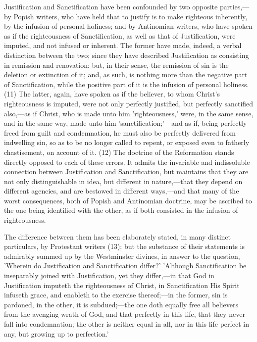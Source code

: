\documentclass[
]{book}
\begin{document}
Justification and Sanctification have been confounded by two opposite parties,---by Popish writers, who have held that to justify is to make righteous inherently, by the infusion of personal holiness; and by Antinomian writers, who have spoken as if the righteousness of Sanctification, as well as that of Justification, were imputed, and not infused or inherent. The former have made, indeed, a verbal distinction between the two; since they have described Justification as consisting in remission and renovation: but, in their sense, the remission of sin is the deletion or extinction of it; and, as such, is nothing more than the negative part of Sanctification, while the positive part of it is the infusion of personal holiness. (11) The latter, again, have spoken as if the believer, to whom Christ's righteousness is imputed, were not only perfectly justified, but perfectly sanctified also,---as if Christ, who is made unto him 'righteousness,' were, in the same sense, and in the same way, made unto him 'sanctification;'---and as if, being perfectly freed from guilt and condemnation, he must also be perfectly delivered from indwelling sin, so as to be no longer called to repent, or exposed even to fatherly chastisement, on account of it. (12) The doctrine of the Reformation stands directly opposed to each of these errors. It admits the invariable and indissoluble connection between Justification and Sanctification, but maintains that they are not only distinguishable in idea, but different in nature,---that they depend on different agencies, and are bestowed in different ways,---and that many of the worst consequences, both of Popish and Antinomian doctrine, may be ascribed to the one being identified with the other, as if both consisted in the infusion of righteousness.

The difference between them has been elaborately stated, in many distinct particulars, by Protestant writers (13); but the substance of their statements is admirably summed up by the Westminster divines, in answer to the question, 'Wherein do Justification and Sanctification differ?' 'Although Sanctification be inseparably joined with Justification, yet they differ,---in that God in Justification imputeth the righteousness of Christ, in Sanctification His Spirit infuseth grace, and enableth to the exercise thereof;---in the former, sin is pardoned, in the other, it is subdued;---the one doth equally free all believers from the avenging wrath of God, and that perfectly in this life, that they never fall into condemnation; the other is neither equal in all, nor in this life perfect in any, but growing up to perfection.'
\end{document}
